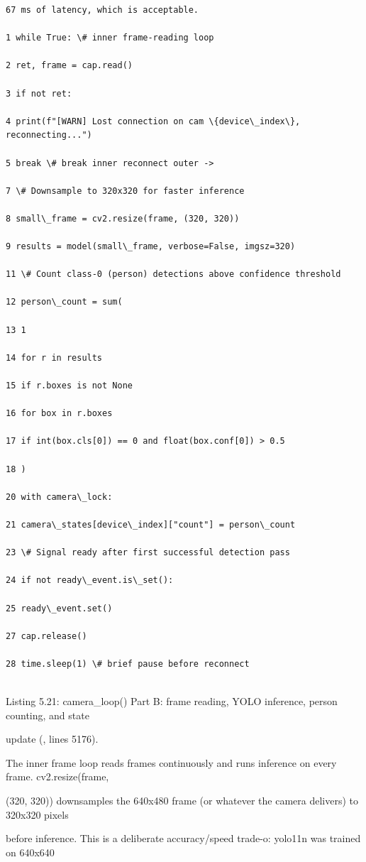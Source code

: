 \begin{listingbox}
	\begin{verbatim}
67 ms of latency, which is acceptable.

1 while True: \# inner frame-reading loop

2 ret, frame = cap.read()

3 if not ret:

4 print(f"[WARN] Lost connection on cam \{device\_index\}, reconnecting...")

5 break \# break inner reconnect outer ->

7 \# Downsample to 320x320 for faster inference

8 small\_frame = cv2.resize(frame, (320, 320))

9 results = model(small\_frame, verbose=False, imgsz=320)

11 \# Count class-0 (person) detections above confidence threshold

12 person\_count = sum(

13 1

14 for r in results

15 if r.boxes is not None

16 for box in r.boxes

17 if int(box.cls[0]) == 0 and float(box.conf[0]) > 0.5

18 )

20 with camera\_lock:

21 camera\_states[device\_index]["count"] = person\_count

23 \# Signal ready after first successful detection pass

24 if not ready\_event.is\_set():

25 ready\_event.set()

27 cap.release()

28 time.sleep(1) \# brief pause before reconnect


\end{verbatim}
\end{listingbox}
Listing 5.21: camera\_loop() Part B: frame reading, YOLO inference, person counting, and state

update (, lines 5176).

The inner frame loop reads frames continuously and runs inference on every frame. cv2.resize(frame,

(320, 320)) downsamples the 640x480 frame (or whatever the camera delivers) to 320x320 pixels

before inference. This is a deliberate accuracy/speed trade-o: yolo11n was trained on 640x640

